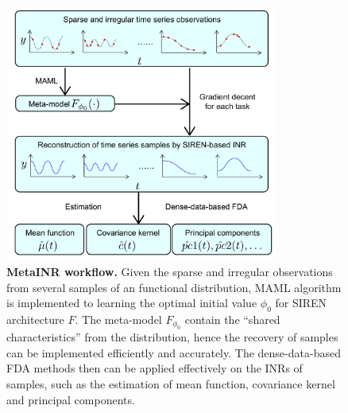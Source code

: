 \documentclass{article}
\begin{document}
\begin{figure}[htb]
  \centering
  \includegraphics[width=0.8\textwidth]{illustration.pdf}
  \caption{\textbf{MetaINR workflow.} Given the sparse and irregular observations from several samples of an functional distribution, MAML algorithm is implemented to learning the optimal initial value $\phi_0$ for SIREN architecture $F$. The meta-model $F_{\phi_0}$ contain the ``shared characteristics'' from the distribution, hence the recovery of samples can be implemented efficiently and accurately.
  The dense-data-based FDA methods then can be applied effectively on the INRs of samples, such as the estimation of mean function, covariance kernel and principal components.}
  \label{MetaINR workflow}
\end{figure}
\end{document}
